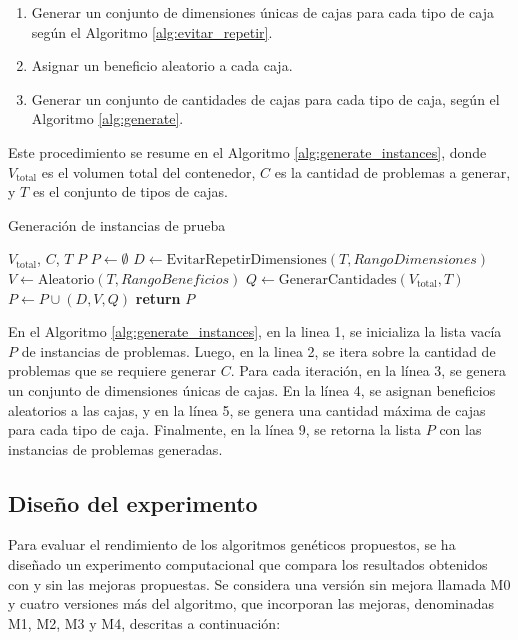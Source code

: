 \documentclass[openany]{article}
\begin{document}
\begin{enumerate}
    \item Generar un conjunto de dimensiones únicas de cajas para cada tipo de caja según el Algoritmo \ref{alg:evitar_repetir}.
    \item Asignar un beneficio aleatorio a cada caja.
    \item Generar un conjunto de cantidades de cajas para cada tipo de caja, según el Algoritmo \ref{alg:generate}.
\end{enumerate}

Este procedimiento se resume en el Algoritmo \ref{alg:generate_instances}, donde $V_{\text{total}}$ es el volumen total del contenedor, $C$ es la cantidad de problemas a generar, y $T$ es el conjunto de tipos de cajas.

\begin{algorithm}[H]
    \caption{Generación de instancias de prueba}
    \label{alg:generate_instances}
    \begin{algorithmic}[1]
        \Require $V_{\text{total}}$, $C$, $T$
        \Ensure $P$
        \State $P \gets \emptyset$
        \State $D \gets \text{EvitarRepetirDimensiones}(T, RangoDimensiones)$
        \State $V \gets \text{Aleatorio}(T, RangoBeneficios)$
        \State $Q \gets \text{GenerarCantidades}(V_{\text{total}}, T)$
        \State $P \gets P \cup (D, V, Q)$
        \EndFor
        \State \textbf{return} $P$
    \end{algorithmic}
\end{algorithm}

En el Algoritmo \ref{alg:generate_instances}, en la linea 1, se inicializa la lista vacía $P$ de instancias de problemas. Luego, en la linea 2, se itera sobre la cantidad de problemas que se requiere generar $C$. Para cada iteración, en la línea 3, se genera un conjunto de dimensiones únicas de cajas. En la línea 4, se asignan beneficios aleatorios a las cajas, y en la línea 5, se genera una cantidad máxima de cajas para cada tipo de caja. Finalmente, en la línea 9, se retorna la lista $P$ con las instancias de problemas generadas.

\subsection{Diseño del experimento}

Para evaluar el rendimiento de los algoritmos genéticos propuestos, se ha diseñado un experimento computacional que compara los resultados obtenidos con y sin las mejoras propuestas. Se considera una versión sin mejora llamada M0 y cuatro versiones más del algoritmo, que incorporan las mejoras, denominadas M1, M2, M3 y M4, descritas a continuación:
\end{document}
